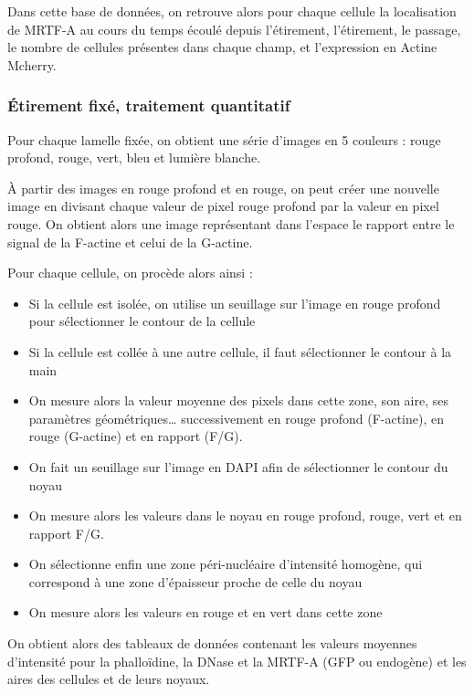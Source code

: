 \documentclass{report}
\begin{document}
	Dans cette base de données, on retrouve alors pour chaque cellule la localisation de MRTF-A au cours du temps écoulé depuis l'étirement, l'étirement, le passage, le nombre de cellules présentes dans chaque champ, et l'expression en Actine Mcherry.
	\subsubsection{\'Etirement fixé, traitement quantitatif}	
	
	Pour chaque lamelle fixée, on obtient une série d'images en 5 couleurs : rouge profond, rouge, vert, bleu et lumière blanche. 

À partir des images en rouge profond et en rouge, on peut créer une nouvelle image en divisant chaque valeur de pixel rouge profond par la valeur en pixel rouge. On obtient alors une image représentant dans l'espace le rapport entre le signal de la F-actine et celui de la G-actine.

Pour chaque cellule, on procède alors ainsi : 
\begin{itemize}
\item Si la cellule est isolée, on utilise un seuillage sur l'image en rouge profond pour sélectionner le contour de la cellule
\item Si la cellule est collée à une autre cellule, il faut sélectionner le contour à la main
\item On mesure alors la valeur moyenne des pixels dans cette zone, son aire, ses paramètres géométriques\dots
successivement en rouge profond (F-actine), en rouge (G-actine) et en rapport (F/G). 
\item On fait un seuillage sur l'image en DAPI afin de sélectionner le contour du noyau
\item On mesure alors les valeurs dans le noyau en rouge profond, rouge, vert et en rapport F/G. 
\item On sélectionne enfin une zone péri-nucléaire d'intensité homogène, qui correspond à une zone d'épaisseur proche de celle du noyau
\item On mesure alors les valeurs en rouge et en vert dans cette zone
\end{itemize}	
	
	On obtient alors des tableaux de données contenant les valeurs moyennes d'intensité pour la phalloïdine, la DNase et la MRTF-A (GFP ou endogène) et les aires des cellules et de leurs noyaux. 
	
	
\end{document}
